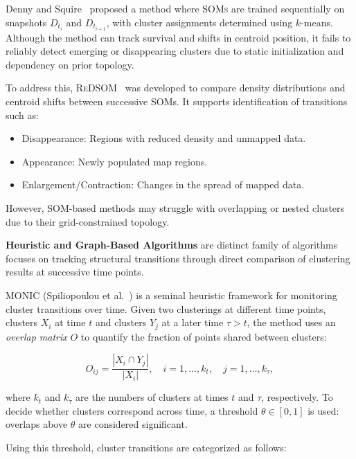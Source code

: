 Denny and Squire~\cite{som_tracking} proposed a method where \textsc{SOMs} are
trained sequentially on snapshots $D_{t_i}$ and $D_{t_{i+1}}$, with cluster
assignments determined using $k$-means. Although the method can track survival
and shifts in centroid position, it fails to reliably detect emerging or
disappearing clusters due to static initialization and dependency on prior
topology.

To address this, \textsc{ReDSOM}~\cite{redsom_tracking} was developed to
compare density distributions and centroid shifts between successive SOMs. It
supports identification of transitions such as:

\begin{itemize}
    \item Disappearance: Regions with reduced density and unmapped data.

    \item Appearance: Newly populated map regions.

    \item Enlargement/Contraction: Changes in the spread of mapped data.
\end{itemize}

However, SOM-based methods may struggle with overlapping or nested clusters due
to their grid-constrained topology.

\textbf{Heuristic and Graph-Based Algorithms} are distinct family of algorithms focuses
on tracking structural transitions through direct comparison of clustering results at
successive time points.

\textsc{MONIC} (Spiliopoulou et al.~\cite{monic}) is a seminal heuristic framework for monitoring cluster transitions over time. Given two clusterings at different time points, clusters $ X_i $ at time $ t $ and clusters $ Y_j $ at a later time $ \tau > t $, the method uses an \emph{overlap matrix} $ O $ to quantify the fraction of points shared between clusters:

\begin{equation}
    O_{ij} = \frac{|X_i \cap Y_j|}{|X_i|}, \quad i = 1, \ldots, k_t, \quad j = 1, \ldots, k_{\tau},
\end{equation}

where $ k_t $ and $ k_{\tau} $ are the numbers of clusters at times $ t $ and $
    \tau $, respectively. To decide whether clusters correspond across time, a
threshold $ \theta \in [0,1] $ is used: overlaps above $ \theta $ are
considered significant.

Using this threshold, cluster transitions are categorized as follows:

